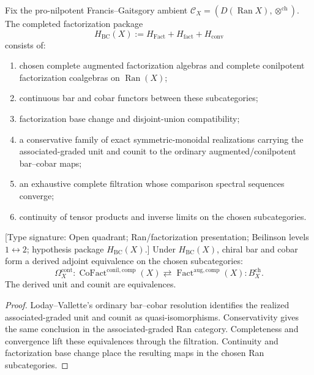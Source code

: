 \begin{definition}
\label{def:preface-ran-package}
Fix the pro-nilpotent Francis--Gaitsgory ambient
\(\mathcal C_X=(D(\operatorname{Ran}X),\otimes^{\mathrm{ch}})\).
The completed factorization package
\[
 H_{\mathrm{BC}}(X):=
 H_{\mathrm{Fact}}+H_{\mathrm{fact}}+H_{\mathrm{conv}}
\]
consists of:
\begin{enumerate}[label=\textup{(\roman*)},leftmargin=*]
\item chosen complete augmented factorization algebras and complete
 conilpotent factorization coalgebras on \(\operatorname{Ran}(X)\);
\item continuous bar and cobar functors between these subcategories;
\item factorization base change and disjoint-union compatibility;
\item a conservative family of exact symmetric-monoidal realizations
 carrying the associated-graded unit and counit to the ordinary
 augmented/conilpotent bar--cobar maps;
\item an exhaustive complete filtration whose comparison spectral
 sequences converge;
\item continuity of tensor products and inverse limits on the chosen
 subcategories.
\end{enumerate}
\end{definition}

\begin{theorem}
\label{thm:preface-theorem-a}
\textup{[Type signature: Open quadrant; Ran/factorization
presentation; Beilinson levels \(1\leftrightarrow2\); hypothesis
package \(H_{\mathrm{BC}}(X)\).]}
Under \(H_{\mathrm{BC}}(X)\), chiral bar and cobar form a derived
adjoint equivalence on the chosen subcategories:
\[
 \Omega_X^{\mathrm{cont}}\colon
 \operatorname{CoFact}^{\mathrm{conil},\mathrm{comp}}(X)
 \rightleftarrows
 \operatorname{Fact}^{\mathrm{aug},\mathrm{comp}}(X)
 :B_X^{\mathrm{ch}}.
\]
The derived unit and counit are equivalences.
\end{theorem}

\begin{proof}
Loday--Vallette's ordinary bar--cobar resolution
\cite[Corollary~2.3.4]{LV12} identifies the realized
associated-graded unit and counit as quasi-isomorphisms.  Conservativity
gives the same conclusion in the associated-graded Ran category.
Completeness and convergence lift these equivalences through the
filtration.  Continuity and factorization base change place the
resulting maps in the chosen Ran subcategories.
\end{proof}

